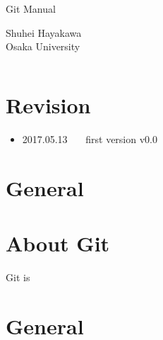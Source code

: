 \documentclass[a4j,12pt]{jsarticle}
\begin{document}
\thispagestyle{mypapernopage}

\sffamily

\begin{center}
  \Large{Git Manual}
\end{center}
\begin{flushright}
  Shuhei Hayakawa \\
  Osaka University
\end{flushright}

\[\]

\setcounter{section}{-1}

\section{Revision}

\begin{itemize}
  \item 2017.05.13 \ \ \ first version \dotfill v0.0
\end{itemize}

\section{General}

\section{About Git}

Git is

\section{General}
\end{document}
